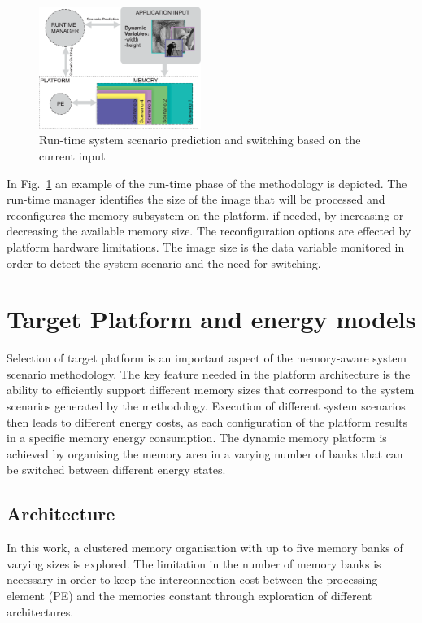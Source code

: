 \documentclass[a4paper,conference]{IEEEtran}
\begin{document}
\begin{figure}[!t]
\centering
\includegraphics[width=0.47\textwidth]{Images/switching.eps}
\caption{Run-time system scenario prediction and switching based on the current input}
\label{fig:runtime}
\end{figure}

In Fig.~\ref{fig:runtime} an example of the run-time phase of the methodology is depicted. The run-time manager identifies the size of the image that will be processed and reconfigures the memory subsystem on the platform, if needed, by increasing or decreasing the available memory size. The reconfiguration options are effected by platform hardware limitations. The image size is the data variable monitored in order to detect the system scenario and the need for switching.

\section{Target Platform and energy models}
\label{sec:platform}

Selection of target platform is an important aspect of the memory-aware system scenario methodology. The key feature needed in the platform architecture is the ability to efficiently support different memory sizes that correspond to the system scenarios generated by the methodology. Execution of different system scenarios then leads to different energy costs, as each configuration of the platform results in a specific memory energy consumption. The dynamic memory platform is achieved by organising the memory area in a varying number of banks that can be switched between different energy states. 

\subsection{Architecture}

In this work, a clustered memory organisation with up to five memory banks of varying sizes is explored. The limitation in the number of memory banks is necessary in order to keep the interconnection cost between the processing element (PE) and the memories constant through exploration of different architectures. 
\end{document}
